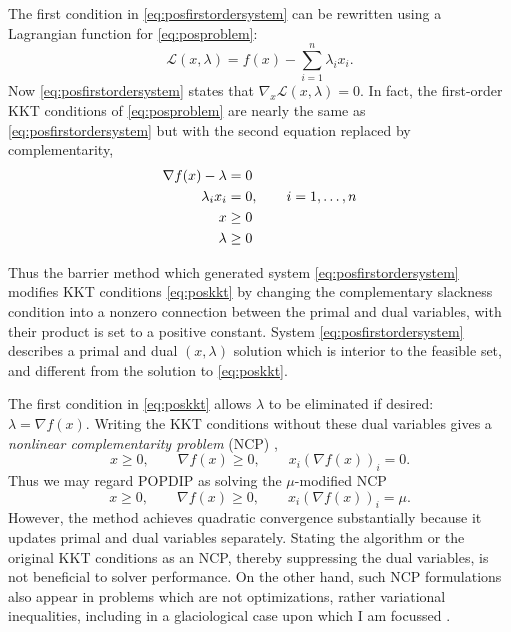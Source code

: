 \documentclass[11pt]{article}
\newcommand{\grad}{\nabla}
\begin{document}
The first condition in \eqref{eq:posfirstordersystem} can be rewritten using a Lagrangian function for \eqref{eq:posproblem}:
\begin{equation}
\mathcal{L}(x,\lambda) = f(x) - \sum_{i=1}^n \lambda_i x_i.  \label{eq:poslagrangian}
\end{equation}
Now \eqref{eq:posfirstordersystem} states that $\grad_x \mathcal{L}(x,\lambda)=0$.  In fact, the first-order KKT conditions \cite[sections 14.4, 14.5]{GrivaNashSofer2009} of \eqref{eq:posproblem} are nearly the same as \eqref{eq:posfirstordersystem} but with the second equation replaced by complementarity,
\begin{align}
\grad f(x) - \lambda &= 0 \label{eq:poskkt} \\
\lambda_i x_i &= 0, \qquad i=1,\dots,n \notag \\
x &\ge 0 \notag \\
\lambda &\ge 0 \notag
\end{align}

Thus the barrier method which generated system \eqref{eq:posfirstordersystem} modifies KKT conditions \eqref{eq:poskkt} by changing the complementary slackness condition into a nonzero connection between the primal and dual variables, with their product is set to a positive constant.  System \eqref{eq:posfirstordersystem} describes a primal and dual $(x,\lambda)$ solution which is interior to the feasible set, and different from the solution to \eqref{eq:poskkt}.

The first condition in \eqref{eq:poskkt} allows $\lambda$ to be eliminated if desired: $\lambda = \grad f(x)$.  Writing the KKT conditions without these dual variables gives a \emph{nonlinear complementarity problem} (NCP) \cite{FacchineiPang2007},
\begin{equation}
x \ge 0, \qquad \grad f(x) \ge 0, \qquad x_i (\grad f(x))_i = 0.  \label{eq:posncp}
\end{equation}
Thus we may regard POPDIP as solving the $\mu$-modified NCP
\begin{equation}
x \ge 0, \qquad \grad f(x) \ge 0, \qquad x_i (\grad f(x))_i = \mu. \label{eq:mumodifiedncp}
\end{equation}
However, the method achieves quadratic convergence substantially because it updates primal and dual variables separately.  Stating the algorithm or the original KKT conditions as an NCP, thereby suppressing the dual variables, is not beneficial to solver performance.  On the other hand, such NCP formulations also appear in problems which are not optimizations, rather variational inequalities, including in a glaciological case upon which I am focussed \cite{Bueler2016}.
\end{document}
